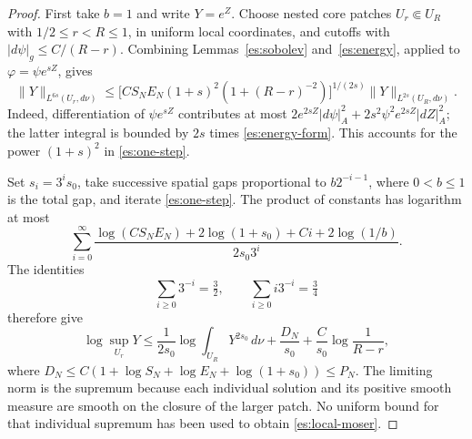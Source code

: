 \begin{proof}
First take $b=1$ and write $Y=e^Z$.  Choose nested core patches
$U_r\Subset U_R$ with $1/2\le r<R\le1$, in uniform local
coordinates, and cutoffs with $|d\psi|_g\le C/(R-r)$.
Combining Lemmas~\ref{es:sobolev} and~\ref{es:energy}, applied to
$\varphi=\psi e^{sZ}$, gives
\begin{equation}\label{es:one-step}
 \|Y\|_{L^{6s}(U_r,d\nu)}
 \le\bigl[C S_NE_N(1+s)^2(1+(R-r)^{-2})\bigr]^{1/(2s)}
        \|Y\|_{L^{2s}(U_R,d\nu)}.
\end{equation}
Indeed, differentiation of $\psi e^{sZ}$ contributes at most
$2e^{2sZ}|d\psi|_A^2+2s^2\psi^2e^{2sZ}|dZ|_A^2$; the latter
integral is bounded by $2s$ times \eqref{es:energy-form}.
This accounts for the power $(1+s)^2$ in
\eqref{es:one-step}.

Set $s_i=3^i s_0$, take successive spatial gaps proportional to
$b2^{-i-1}$, where $0<b\le1$ is the total gap, and iterate
\eqref{es:one-step}.  The product of constants has logarithm at most
\[
 \sum_{i=0}^{\infty}\frac{
  \log(C S_NE_N)+2\log(1+s_0)+C i+2\log(1/b)}{2s_0 3^i}.
\]
The identities
\[
 \sum_{i\ge0}3^{-i}=\tfrac32,
 \qquad \sum_{i\ge0}i3^{-i}=\tfrac34
\]
therefore give
\begin{equation}\label{es:local-moser}
 \log\sup_{U_r}Y
 \le\frac1{2s_0}\log\int_{U_R}Y^{2s_0}\,d\nu
       +\frac{D_N}{s_0}
       +\frac{C}{s_0}\log\frac1{R-r},
\end{equation}
where
$D_N\le C(1+\log S_N+\log E_N+\log(1+s_0))\le P_N$.
The limiting norm is the supremum because each individual solution
and its positive smooth measure are smooth on the closure of the
larger patch.  No uniform bound for that individual supremum has
been used to obtain \eqref{es:local-moser}.


\end{proof}
